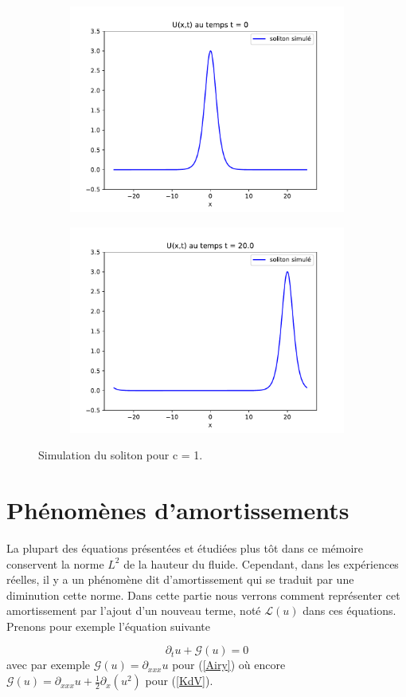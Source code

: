 \documentclass[12pt,a4paper]{article}
\numberwithin{equation}{section}
\begin{document}
\begin{figure}[H]
\centering
\begin{subfigure}
  \centering
  \includegraphics[width=0.45\linewidth]{graphs/Soliton_t0.pdf}
  \label{fig:sub1}
\end{subfigure}%
\begin{subfigure}
  \centering
  \includegraphics[width=0.45\linewidth]{graphs/Soliton_t1.pdf}
  \label{fig:sub2}
\end{subfigure}
\caption{Simulation du soliton pour c = 1.} 
\end{figure}


\newpage
\section{Phénomènes d'amortissements}


La plupart des équations présentées et étudiées plus tôt dans ce mémoire conservent la norme $L^2$ de la hauteur du fluide. Cependant, dans les expériences réelles, il y a un phénomène dit d'amortissement qui se traduit par une diminution cette norme. Dans cette partie nous verrons comment représenter cet amortissement par l'ajout d'un nouveau terme, noté $\mathcal{L}(u)$ dans ces équations. Prenons pour exemple l'équation suivante

\begin{equation}
    \partial_t u + \mathcal{G}(u) = 0
\end{equation}
avec par exemple  $\mathcal{G}(u) = \partial_{xxx}u$ pour (\ref{Airy}) où encore $\mathcal{G}(u) = \partial_{xxx}u + \frac{1}{2}\partial_x(u^2)$ pour (\ref{KdV}). 
\end{document}
